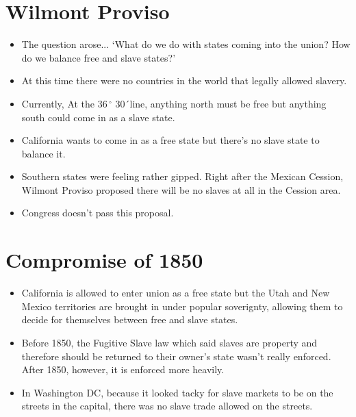 \documentclass{article}
\begin{document}
\section{Wilmont Proviso}
  \begin{itemize}
    \item The question arose... `What do we do with states coming into the union? How do we balance free and slave states?'
    \item At this time there were no countries in the world that legally allowed slavery.
    \item Currently, At the $36\,^{\circ}$ 30\'\ line, anything north must be free but anything south could come in as a slave state.
    \item California wants to come in as a free state but there's no slave state to balance it.
    \item Southern states were feeling rather gipped. Right after the Mexican Cession, Wilmont Proviso proposed there will be no slaves at all in the Cession area.
    \item Congress doesn't pass this proposal.
  \end{itemize}

\section{Compromise of 1850}
  \begin{itemize}
    \item California is allowed to enter union as a free state but the Utah and New Mexico territories are brought in under popular soverignty, allowing them to decide for themselves between free and slave states.
    \item Before 1850, the Fugitive Slave law which said slaves are property and therefore should be returned to their owner's state wasn't really enforced. After 1850, however, it is enforced more heavily.
    \item In Washington DC, because it looked tacky for slave markets to be on the streets in the capital, there was no slave trade allowed on the streets.
  \end{itemize}
\end{document}
